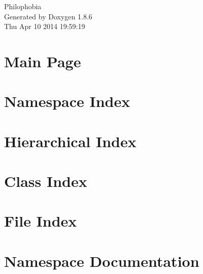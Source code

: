 \documentclass[twoside]{book}
\newcommand{\clearemptydoublepage}{%
  \newpage{\pagestyle{empty}\cleardoublepage}%
}
\begin{document}
\hypersetup{pageanchor=false}
\begin{titlepage}
\vspace*{7cm}
\begin{center}%
{\Large Philophobia }\\
\vspace*{1cm}
{\large Generated by Doxygen 1.8.6}\\
\vspace*{0.5cm}
{\small Thu Apr 10 2014 19:59:19}\\
\end{center}
\end{titlepage}
\clearemptydoublepage
\tableofcontents
\clearemptydoublepage
{}
\hypersetup{pageanchor=true}

\chapter{Main Page}
\label{index}\hypertarget{index}{}
\chapter{Namespace Index}

\chapter{Hierarchical Index}

\chapter{Class Index}

\chapter{File Index}

\chapter{Namespace Documentation}












\end{document}
